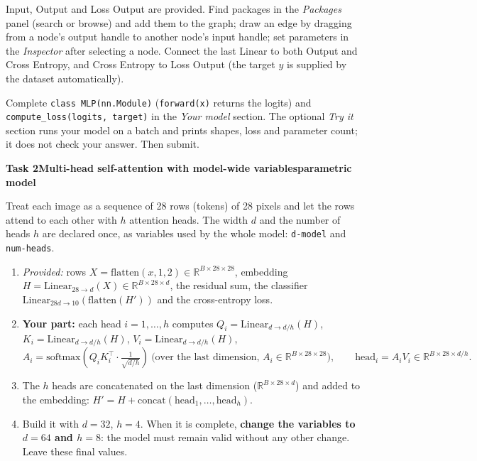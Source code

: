 \documentclass[10pt,a4paper]{article}
\newcommand{\task}[3]{%
    \par\medskip
    {\color{groupcolor}\large\bfseries #1\quad #2\hfill\normalfont\footnotesize #3}\par
    \smallskip}
\newcommand{\pkg}[1]{\textsf{#1}}
\begin{document}
\begin{nnm}
Input, Output and Loss Output are provided. Find packages in the
\emph{Packages} panel (search or browse) and add them to the graph; draw an
edge by dragging from a node's output handle to another node's input handle;
set parameters in the \emph{Inspector} after selecting a node. Connect the last
Linear to both \pkg{Output} and \pkg{Cross Entropy}, and \pkg{Cross Entropy} to
\pkg{Loss Output} (the target \(y\) is supplied by the dataset automatically).
\end{nnm}
\begin{torch}
Complete \texttt{class MLP(nn.Module)} (\texttt{forward(x)} returns the logits)
and \texttt{compute\_loss(logits, target)} in the \emph{Your model} section. The optional
\emph{Try it} section runs your model on a batch and prints shapes, loss and parameter
count; it does not check your answer. Then submit.
\end{torch}

\clearpage
\task{Task 2}{Multi-head self-attention with model-wide variables}{parametric model}

Treat each image as a sequence of 28 rows (tokens) of 28 pixels and let the
rows attend to each other with \(h\) attention heads. The width \(d\) and the
number of heads \(h\) are declared once, as variables used by the whole model:
\texttt{d-model} and \texttt{num-heads}.
\begin{enumerate}
    \item \emph{Provided:} rows \(X = \mathrm{flatten}(x, 1, 2) \in \mathbb{R}^{B\times28\times28}\),
    embedding \(H = \mathrm{Linear}_{28\to d}(X) \in \mathbb{R}^{B\times28\times d}\), the residual
    sum, the classifier \(\mathrm{Linear}_{28d\to10}(\mathrm{flatten}(H'))\) and the cross-entropy loss.
    \item \textbf{Your part:} each head \(i = 1,\dots,h\) computes
    \(Q_i = \mathrm{Linear}_{d\to d/h}(H)\), \(K_i = \mathrm{Linear}_{d\to d/h}(H)\),
    \(V_i = \mathrm{Linear}_{d\to d/h}(H)\),
    \[
    A_i = \mathrm{softmax}\!\left(Q_i K_i^{\top} \cdot \tfrac{1}{\sqrt{d/h}}\right)\ \text{(over the last dimension, } A_i\in\mathbb{R}^{B\times28\times28}\text{)},
    \qquad \mathrm{head}_i = A_i V_i \in \mathbb{R}^{B\times28\times d/h}.
    \]
    \item The \(h\) heads are concatenated on the last dimension (\(\mathbb{R}^{B\times28\times d}\)) and
    added to the embedding: \(H' = H + \mathrm{concat}(\mathrm{head}_1,\dots,\mathrm{head}_h)\).
    \item Build it with \(d = 32\), \(h = 4\). When it is complete, \textbf{change the variables to
    \(d = 64\) and \(h = 8\)}: the model must remain valid without any other change.
    Leave these final values.
\end{enumerate}
\end{document}
